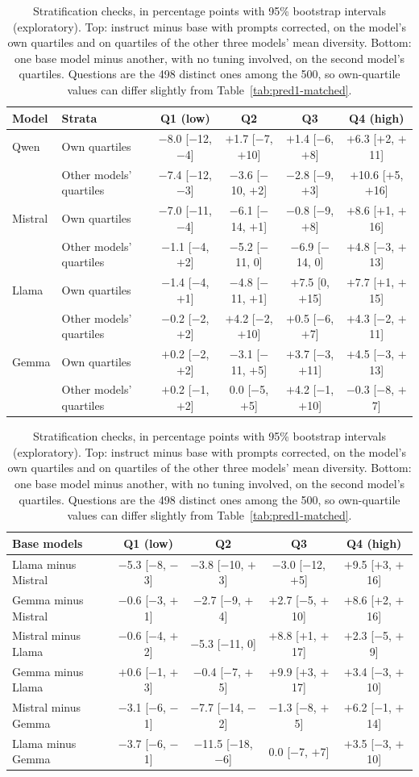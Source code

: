 \begin{table}[h]
\centering
\scriptsize
\setlength{\tabcolsep}{3pt}
\begin{tabular}{llcccc}
\toprule
Model & Strata & Q1 (low) & Q2 & Q3 & Q4 (high) \\
\midrule
Qwen & Own quartiles & $-$8.0 [$-$12, $-$4] & $+$1.7 [$-$7, $+$10] & $+$1.4 [$-$6, $+$8] & $+$6.3 [$+$2, $+$11] \\
 & Other models' quartiles & $-$7.4 [$-$12, $-$3] & $-$3.6 [$-$10, $+$2] & $-$2.8 [$-$9, $+$3] & $+$10.6 [$+$5, $+$16] \\
Mistral & Own quartiles & $-$7.0 [$-$11, $-$4] & $-$6.1 [$-$14, $+$1] & $-$0.8 [$-$9, $+$8] & $+$8.6 [$+$1, $+$16] \\
 & Other models' quartiles & $-$1.1 [$-$4, $+$2] & $-$5.2 [$-$11, 0] & $-$6.9 [$-$14, 0] & $+$4.8 [$-$3, $+$13] \\
Llama & Own quartiles & $-$1.4 [$-$4, $+$1] & $-$4.8 [$-$11, $+$1] & $+$7.5 [0, $+$15] & $+$7.7 [$+$1, $+$15] \\
 & Other models' quartiles & $-$0.2 [$-$2, $+$2] & $+$4.2 [$-$2, $+$10] & $+$0.5 [$-$6, $+$7] & $+$4.3 [$-$2, $+$11] \\
Gemma & Own quartiles & $+$0.2 [$-$2, $+$2] & $-$3.1 [$-$11, $+$5] & $+$3.7 [$-$3, $+$11] & $+$4.5 [$-$3, $+$13] \\
 & Other models' quartiles & $+$0.2 [$-$1, $+$2] & 0.0 [$-$5, $+$5] & $+$4.2 [$-$1, $+$10] & $-$0.3 [$-$8, $+$7] \\
\bottomrule
\end{tabular}

\medskip
\setlength{\tabcolsep}{3pt}
\begin{tabular}{lcccc}
\toprule
Base models & Q1 (low) & Q2 & Q3 & Q4 (high) \\
\midrule
Llama minus Mistral & $-$5.3 [$-$8, $-$3] & $-$3.8 [$-$10, $+$3] & $-$3.0 [$-$12, $+$5] & $+$9.5 [$+$3, $+$16] \\
Gemma minus Mistral & $-$0.6 [$-$3, $+$1] & $-$2.7 [$-$9, $+$4] & $+$2.7 [$-$5, $+$10] & $+$8.6 [$+$2, $+$16] \\
Mistral minus Llama & $-$0.6 [$-$4, $+$2] & $-$5.3 [$-$11, 0] & $+$8.8 [$+$1, $+$17] & $+$2.3 [$-$5, $+$9] \\
Gemma minus Llama & $+$0.6 [$-$1, $+$3] & $-$0.4 [$-$7, $+$5] & $+$9.9 [$+$3, $+$17] & $+$3.4 [$-$3, $+$10] \\
Mistral minus Gemma & $-$3.1 [$-$6, $-$1] & $-$7.7 [$-$14, $-$2] & $-$1.3 [$-$8, $+$5] & $+$6.2 [$-$1, $+$14] \\
Llama minus Gemma & $-$3.7 [$-$6, $-$1] & $-$11.5 [$-$18, $-$6] & 0.0 [$-$7, $+$7] & $+$3.5 [$-$3, $+$10] \\
\bottomrule
\end{tabular}
\caption{Stratification checks, in percentage points with 95\% bootstrap intervals (exploratory). Top: instruct minus base with prompts corrected, on the model's own quartiles and on quartiles of the other three models' mean diversity. Bottom: one base model minus another, with no tuning involved, on the second model's quartiles. Questions are the 498 distinct ones among the 500, so own-quartile values can differ slightly from Table~\ref{tab:pred1-matched}.}
\label{tab:pred1-strata}
\end{table}

